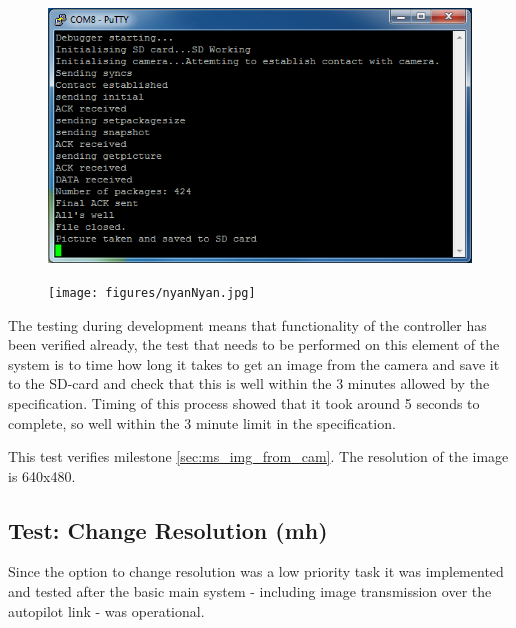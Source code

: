\begin{figure}[H]
        \centering
        \includegraphics[width=1.00\textwidth]{testing_screenshots/camera_image_saving_sd_card_test.png}
        \label{fig:test_camera_image_saving_sd_card}
\end{figure}

\begin{figure}[H]
        \centering
        \texttt{[image: figures/nyanNyan.jpg]}
        \label{fig:Nyan1}
\end{figure}

The testing during development means that functionality of the controller has been verified already, the test that needs to be performed on this element of the system is to time how long it takes to get an image from the camera and save it to the SD-card and check that this is well within the 3 minutes allowed by the specification. Timing of this process showed that it took around 5 seconds to complete, so well within the 3 minute limit in the specification.

This test verifies milestone \ref{sec:ms_img_from_cam}. The resolution of the image is 640x480.

\subsection{Test: Change Resolution (mh)}
\label{sec:test_change_resolution}

Since the option to change resolution was a low priority task it was implemented and tested after the basic main system - including image transmission over the autopilot link - was operational.

